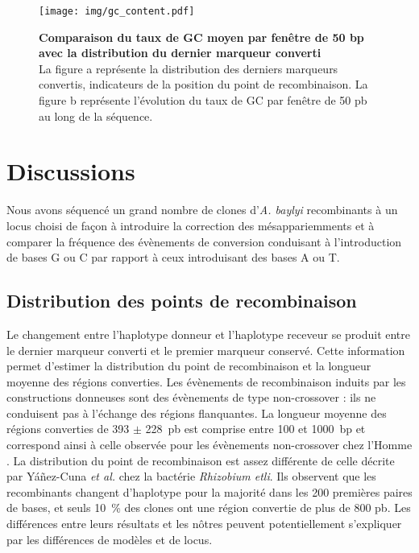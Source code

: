   \null
  \vfill


  \begin{figure}[htbp]
    \centering


    \texttt{[image: img/gc\_content.pdf]}

    \caption[Taux de GC et Taux de Recombinaison]{\textbf{Comparaison du taux de
        GC moyen par fenêtre de 50 bp avec la distribution du dernier marqueur converti} \\
      \rmfamily La figure \textsf{a} représente la distribution des derniers
      marqueurs convertis, indicateurs de la position du point de recombinaison.
      La figure \textsf{b} représente l'évolution du taux de GC par fenêtre de
      50 pb au long de la séquence.
    }
    \label{fig:gctaux}
  \end{figure}

  \vfill
  \thispagestyle{empty}
  \addtocounter{page}{-1}
  \clearpage
  \newpage

\section{Discussions}
\label{sec:discussions}

Nous avons séquencé un grand nombre de clones d'\emph{A. baylyi} recombinants à
un locus choisi de façon à introduire la correction des mésappariemments et à
comparer la fréquence des évènements de conversion conduisant à l'introduction
de bases G ou C par rapport à ceux introduisant des bases A ou T.

\subsection{Distribution des points de recombinaison}

\afterpage{\blankpage}

Le changement entre l'haplotype donneur et l'haplotype receveur se produit entre
le dernier marqueur converti et le premier marqueur conservé. Cette information
permet d'estimer la distribution du point de recombinaison et la longueur
moyenne des régions converties. Les évènements de recombinaison induits par les
constructions donneuses sont des évènements de type non-crossover : ils ne
conduisent pas à l'échange des régions flanquantes\cite{chen_gene_2007}. La
longueur moyenne des régions converties de \num{393} \(\pm\) \num{228}~pb est
comprise entre \num{100} et \num{1000}~bp et correspond ainsi à celle observée
pour les évènements non-crossover chez l'Homme
\cite{williams_non-crossover_2015}. La distribution du point de recombinaison
est assez différente de celle décrite par Yáñez-Cuna \emph{et
  al.}\cite{yanez-cuna_biased_2015} chez la bactérie \emph{Rhizobium etli}. Ils
observent que les recombinants changent d'haplotype pour la majorité dans les
\num{200} premières paires de bases, et seuls \SI{10}{\percent} des clones ont
une région convertie de plus de \num{800} pb. Les différences entre leurs
résultats et les nôtres peuvent potentiellement s'expliquer par les différences
de modèles et de locus.

